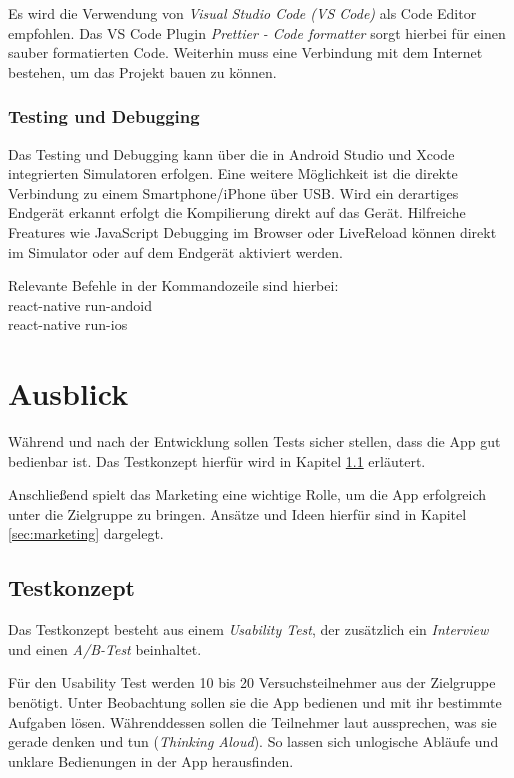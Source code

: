 Es wird die Verwendung von \emph{Visual Studio Code (VS Code)} als Code Editor empfohlen.
Das VS Code Plugin \emph{Prettier - Code formatter} sorgt hierbei für einen sauber formatierten Code. Weiterhin muss eine Verbindung mit dem Internet bestehen, um das Projekt bauen zu können.

\subsection{Testing und Debugging}
Das Testing und Debugging kann über die in Android Studio und Xcode integrierten Simulatoren erfolgen.
Eine weitere Möglichkeit ist die direkte Verbindung zu einem Smartphone/iPhone über USB.
Wird ein derartiges Endgerät erkannt erfolgt die Kompilierung direkt auf das Gerät.
Hilfreiche Freatures wie JavaScript Debugging im Browser oder LiveReload können direkt im Simulator oder auf dem Endgerät aktiviert werden.

Relevante Befehle in der Kommandozeile sind hierbei:\\
react-native run-andoid\\
react-native run-ios






\chapter{Ausblick}
\label{ausblick}
Während und nach der Entwicklung sollen Tests sicher stellen, dass die App gut bedienbar ist. Das Testkonzept hierfür wird in Kapitel \ref{sec:testkonzept} erläutert.

Anschließend spielt das Marketing eine wichtige Rolle, um die App erfolgreich unter die Zielgruppe zu bringen. Ansätze und Ideen hierfür sind in Kapitel \ref{sec:marketing} dargelegt.

\section{Testkonzept}
\label{sec:testkonzept}
Das Testkonzept besteht aus einem \emph{Usability Test}, der zusätzlich ein \emph{Interview} und einen \emph{A/B-Test} beinhaltet.

Für den Usability Test werden 10 bis 20  Versuchsteilnehmer aus der Zielgruppe benötigt. Unter Beobachtung sollen sie die App bedienen und mit ihr bestimmte Aufgaben lösen. Währenddessen sollen die Teilnehmer laut aussprechen, was sie gerade denken und tun (\emph{Thinking Aloud}). So lassen sich unlogische Abläufe und unklare Bedienungen in der App herausfinden.

